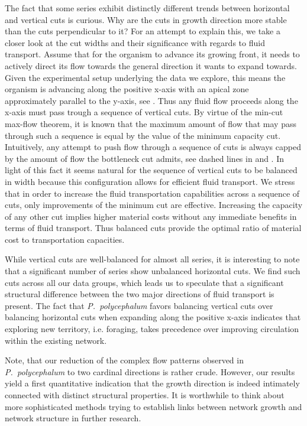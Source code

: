 		The fact that some series exhibit distinctly different trends between horizontal and vertical cuts is curious. Why are the cuts in growth direction more stable than the cuts perpendicular to it? For an attempt to explain this, we take a closer look at the cut widths and their significance with regards to fluid transport. Assume that for the organism to advance its growing front, it needs to actively direct its flow towards the general direction it wants to expand towards. Given the experimental setup underlying the data we explore, this means the organism is advancing along the positive x-axis with an apical zone approximately parallel to the y-axis, see . Thus any fluid flow proceeds along the x-axis must pass trough a sequence of vertical cuts. By virtue of the min-cut max-flow theorem, it is known that the maximum amount of flow that may pass through such a sequence is equal by the value of the minimum capacity cut. Intuitively, any attempt to push flow through a sequence of cuts is always capped by the amount of flow the bottleneck cut admits, see dashed lines in  and . In light of this fact it seems natural for the sequence of vertical cuts to be balanced in width because this configuration allows for efficient fluid transport. We stress that in order to increase the fluid transportation capabilities across a sequence of cuts, only improvements of the minimum cut are effective. Increasing the capacity of any other cut implies higher material costs without any immediate benefits in terms of fluid transport. Thus balanced cuts provide the optimal ratio of material cost to transportation capacities.

		While vertical cuts are well-balanced for almost all series, it is interesting to note that a significant number of series show unbalanced horizontal cuts. We find such cuts across all our data groups, which leads us to speculate that a significant structural difference between the two major directions of fluid transport is present. The fact that \emph{P.~polycephalum} favors balancing vertical cuts over balancing horizontal cuts when expanding along the positive x-axis indicates that exploring new territory, i.e. foraging, takes precedence over improving circulation within the existing network.

		Note, that our reduction of the complex flow patterns observed in \emph{P.~polycephalum} to two cardinal directions is rather crude. However, our results yield a first quantitative indication that the growth direction is indeed intimately connected with distinct structural properties. It is worthwhile to think about more sophisticated methods trying to establish links between network growth and network structure in further research.

